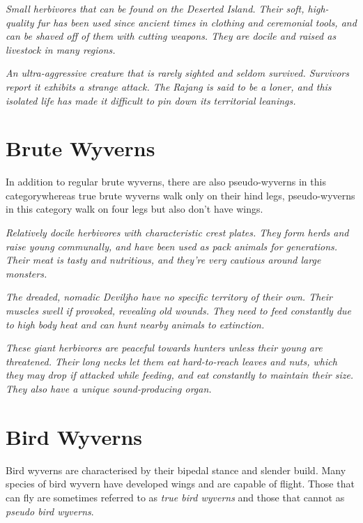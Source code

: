 \textit{Small herbivores that can be found on the Deserted Island. Their soft, high-quality fur has been used since ancient times in clothing and ceremonial tools, and can be shaved off of them with cutting weapons. They are docile and raised as livestock in many regions.}

\textit{An ultra-aggressive creature that is rarely sighted and seldom survived. Survivors report it exhibits a strange attack. The Rajang is said to be a loner, and this isolated life has made it difficult to pin down its territorial leanings.}

\section{Brute Wyverns}
In addition to regular brute wyverns, there are also pseudo-wyverns in this category\hbNone whereas true brute wyverns walk only on their hind legs, pseudo-wyverns in this category walk on four legs but also don't have wings.

\textit{Relatively docile herbivores with characteristic crest plates. They form herds and raise young communally, and have been used as pack animals for generations. Their meat is tasty and nutritious, and they're very cautious around large monsters.}

\textit{The dreaded, nomadic Deviljho have no specific territory of their own. Their muscles swell if provoked, revealing old wounds. They need to feed constantly due to high body heat and can hunt nearby animals to extinction.}

\textit{These giant herbivores are peaceful towards hunters unless their young are threatened. Their long necks let them eat hard-to-reach leaves and nuts, which they may drop if attacked while feeding, and eat constantly to maintain their size. They also have a unique sound-producing organ.}

\section{Bird Wyverns}
Bird wyverns are characterised by their bipedal stance and slender build. Many species of bird wyvern have developed wings and are capable of flight. Those that can fly are sometimes referred to as \emph{true bird wyverns} and those that cannot as \emph{pseudo bird wyverns}.

